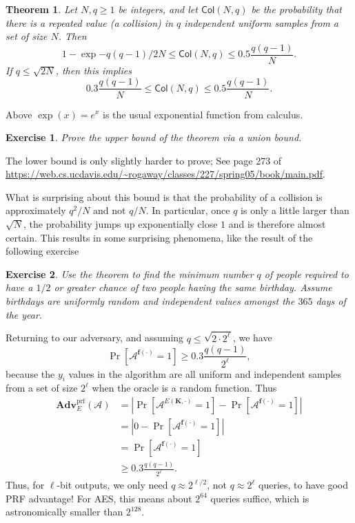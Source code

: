 \documentclass[11pt]{article}
\newtheorem{exercise}{Exercise}
\newtheorem{theorem}{Theorem}
\newcommand{\calA}{\mathcal{A}}
\newcommand{\Adv}{\mathbf{Adv}}
\newcommand{\AdvPRF}[2]{\Adv^{\mathrm{prf}}_{#1}({#2})}
\newcommand{\bK}{\mathbf{K}}
\newcommand{\bof}{\mathbf{f}}
\newcommand{\Col}{\mathsf{Col}}
\begin{document}
\begin{theorem}
    Let $N,q\geq 1$ be integers, and let $\Col(N,q)$ be the probability that
    there is a repeated value (a \emph{collision}) in $q$ independent uniform
    samples from a set of size $N$. Then
    \[
        1 - \exp{-q(q-1)/2N} \leq \Col(N,q) \leq 0.5\frac{q(q-1)}{N}.
    \]
    If $q\leq \sqrt{2N}$, then this implies
    \[
        0.3 \frac{q(q-1)}{N} \leq \Col(N,q) \leq 0.5\frac{q(q-1)}{N}.
    \]
\end{theorem}
Above $\exp(x)=e^x$ is the usual exponential function from calculus.
\begin{exercise}
    Prove the upper bound of the theorem via a union bound.
\end{exercise}
The lower bound is only slightly harder to prove; See page 273 of
\url{https://web.cs.ucdavis.edu/~rogaway/classes/227/spring05/book/main.pdf}.

What is surprising about this bound is that the probability of a collision
is approximately $q^2/N$ and not $q/N$. In particular, once $q$ is only
a little larger than $\sqrt{N}$, the probability jumps up exponentially close
$1$ and is therefore almost certain. This results in some surprising
phenomena, like the result of the following exercise
\begin{exercise}
    Use the theorem to find the minimum number $q$ of people required to have
    a $1/2$ or greater chance of two people having the same birthday. Assume
    birthdays are uniformly random and independent values amongst the
    $365$ days of the year.
\end{exercise}

Returning to our adversary, and assuming $q\leq \sqrt{2\cdot 2^\ell}$, we
have
\[
    \Pr[\calA^{\bof(\cdot)}=1] \geq 0.3 \frac{q(q-1)}{2^\ell},
\]
because the $y_i$ values in the algorithm are all uniform and independent
samples from a set of size $2^\ell$ when the oracle is a random function. 
Thus
\begin{align*}
    \AdvPRF{E}{\calA} 
    & = \left|\Pr[\calA^{E(\bK,\cdot)}=1]-\Pr[\calA^{\bof(\cdot)}=1]\right| \\
    & = \left|0-\Pr[\calA^{\bof(\cdot)}=1]\right| \\
    & = \Pr[\calA^{\bof(\cdot)}=1] \\
    & \geq  0.3 \frac{q(q-1)}{2^\ell}.
\end{align*}
Thus, for $\ell$-bit outputs, we only need $q\approx 2^{\ell/2}$, not
$q\approx 2^{\ell}$ queries, to have good PRF advantage! For AES, this
means about $2^{64}$ queries suffice, which is astronomically smaller
than $2^{128}$.
\end{document}
